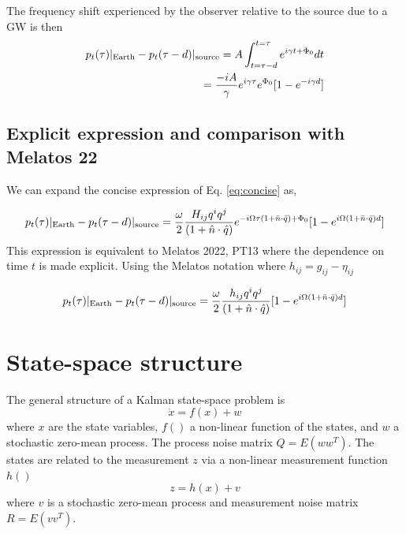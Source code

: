 \documentclass[fleqn,usenatbib,useAMS]{mnras}
\begin{document}
The frequency shift experienced by the observer relative to the source due to a GW is then
\begin{align}
	p_t(\tau)|_{\rm Earth} - p_t(\tau - d)|_{\rm source} = A \int_{t = \tau - d}^{t=\tau} e^{i \gamma t + \Phi_0}dt  \\
	=\frac{-iA}{\gamma} e^{i \gamma \tau}e^{\Phi_0}[1 - e^{-i \gamma d}] 
	\label{eq:concise}
\end{align}

\subsection{Explicit expression and comparison with Melatos 22}

We can expand the concise expression of Eq. \ref{eq:concise} as,

\begin{equation} \label{eq:final}
	p_t(\tau)|_{\rm Earth} - p_t(\tau - d)|_{\rm source} =\frac{ \omega}{2} \frac{H_{ij}q^i q^j  }{(1 + \hat{n} \cdot \hat{q})}e^{-i \Omega \tau(1+\bar{n} \cdot \bar{q}) + \Phi_0} [1 - e^{i \Omega(1+\bar{n} \cdot \bar{q}) d}]
\end{equation}
This expression is equivalent to Melatos 2022, PT13 where the dependence on time $t$ is made explicit. Using the Melatos notation where $h_{ij} = g_{ij} - \eta_{ij}$


\begin{equation}
	p_t(\tau)|_{\rm Earth} - p_t(\tau - d)|_{\rm source} =\frac{ \omega}{2} \frac{h_{ij} q^i q^j  }{(1 + \hat{n} \cdot \hat{q})} [1 - e^{i \Omega(1+\bar{n} \cdot \bar{q}) d}]
\end{equation}

\newpage
\section{State-space structure} \label{sec3}
\noindent The general structure of a Kalman state-space problem is
\begin{equation}
	\dot{x} = f(x) + w
\end{equation}
where $x$ are the state variables, $f()$ a non-linear function of the states, and $w$ a stochastic zero-mean process. The process noise matrix $Q = E(w w^T)$. The states are related to the measurement $z$ via a non-linear measurement function $h()$
\begin{equation}
	z = h(x) + v
\end{equation}
where $v$ is a stochastic zero-mean process and measurement noise matrix $R = E(v v^T)$. \newline 
\end{document}
